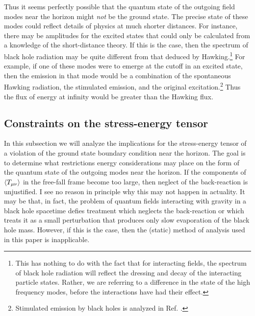 Thus it seems perfectly possible that the quantum state of the outgoing
field modes near the horizon might {\it not} be the ground state.
The precise state of these modes could reflect details of physics
at much shorter distances. For instance, there may be amplitudes
for the excited states that could only be calculated from a
knowledge of the short-distance theory. If this is the case, then
the spectrum of black hole radiation may be quite different from
that deduced by Hawking.\footnote{This has nothing to do with the
fact that for interacting fields, the spectrum of black hole
radiation will reflect the dressing and decay of the interacting
particle states. Rather, we are referring to a
difference in the state of the high frequency modes, before the
interactions have had their effect.}
For example, if one of these modes
were to emerge at the cutoff in an excited state, then the
emission in that mode would be a combination of the spontaneous
Hawking radiation, the stimulated emission, and the original
excitation.\footnote{Stimulated emission by black
holes is analyzed in Ref. \cite{Waldstim}.}
Thus the flux of energy at infinity would be greater than
the Hawking flux.

\subsection{Constraints on the stress-energy tensor}
\label{subsec:constraints}

In this subsection we will analyze the implications for the
stress-energy tensor of a violation of the ground state
boundary condition near the horizon. The goal is to
determine what restrictions energy considerations may
place on the form of the quantum state of the outgoing
modes near the horizon. If the components of $\langle T_{\mu\nu}\rangle$
in the free-fall frame become too large, then neglect
of the back-reaction is unjustified. I see no reason in
principle why this may not happen in actuality. It may
be that, in fact, the problem of quantum fields
interacting with gravity in a black hole spacetime
defies treatment which neglects the back-reaction or
which treats it as a small perturbation that produces
only slow evaporation of the black hole mass. However,
if this is the case, then the (static) method of analysis used
in this paper is inapplicable.

